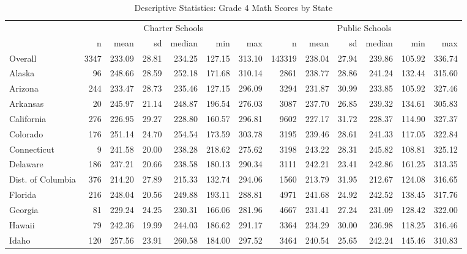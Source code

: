 \begin{sidewaystable}[htb]
\begin{center}
\caption{Descriptive Statistics: Grade 4 Math Scores by State}
\label{g4mathdesc}
{\smaller
\begin{tabular}{lrrrrrr@{\extracolsep{10pt}}rrrrrr}
  \hline & \multicolumn{6}{c}{Charter Schools} & \multicolumn{6}{c}{Public Schools} \\ \cline{2-7} \cline{8-13} & n & mean & sd & median & min & max & n & mean & sd & median & min & max \\ 
  \hline
Overall & 3347 & 233.09 & 28.81 & 234.25 & 127.15 & 313.10 & 143319 & 238.04 & 27.94 & 239.86 & 105.92 & 336.74 \\ 
  Alaska &  96 & 248.66 & 28.59 & 252.18 & 171.68 & 310.14 & 2861 & 238.77 & 28.86 & 241.24 & 132.44 & 315.60 \\ 
  Arizona & 244 & 233.47 & 28.73 & 235.46 & 127.15 & 296.09 & 3294 & 231.87 & 30.99 & 233.85 & 105.92 & 327.46 \\ 
  Arkansas &  20 & 245.97 & 21.14 & 248.87 & 196.54 & 276.03 & 3087 & 237.70 & 26.85 & 239.32 & 134.61 & 305.83 \\ 
  California & 276 & 226.95 & 29.27 & 228.80 & 160.57 & 296.81 & 9602 & 227.17 & 31.72 & 228.37 & 114.90 & 327.37 \\ 
  Colorado & 176 & 251.14 & 24.70 & 254.54 & 173.59 & 303.78 & 3195 & 239.46 & 28.61 & 241.33 & 117.05 & 322.84 \\ 
  Connecticut &   9 & 241.58 & 20.00 & 238.28 & 218.62 & 275.62 & 3198 & 243.22 & 28.31 & 245.82 & 108.81 & 325.12 \\ 
  Delaware & 186 & 237.21 & 20.66 & 238.58 & 180.13 & 290.34 & 3111 & 242.21 & 23.41 & 242.86 & 161.25 & 313.35 \\ 
  Dist. of Columbia & 376 & 214.20 & 27.89 & 215.33 & 132.74 & 294.06 & 1560 & 213.79 & 31.95 & 212.67 & 124.08 & 316.65 \\ 
  Florida & 216 & 248.04 & 20.56 & 249.88 & 193.11 & 288.81 & 4971 & 241.68 & 24.92 & 242.52 & 138.45 & 317.76 \\ 
  Georgia &  81 & 229.24 & 24.25 & 230.31 & 166.06 & 281.96 & 4667 & 231.41 & 27.24 & 231.09 & 128.42 & 322.00 \\ 
  Hawaii &  79 & 242.36 & 19.99 & 244.03 & 186.62 & 291.17 & 3364 & 234.29 & 30.00 & 236.98 & 118.25 & 316.46 \\ 
  Idaho & 120 & 257.56 & 23.91 & 260.58 & 184.00 & 297.52 & 3464 & 240.54 & 25.65 & 242.24 & 145.46 & 310.83 \\ 

\end{tabular}}
\end{center}
\end{sidewaystable}
